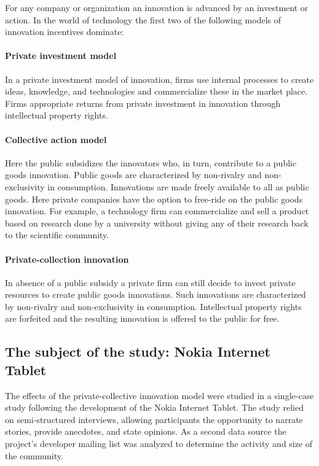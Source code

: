 \documentclass[a4paper]{scrartcl}
\begin{document}
For any company or organization an innovation is advanced by an investment or action.
In the world of technology the first two of the following models of innovation incentives dominate:

\paragraph{Private investment model}
In a private investment model of innovation, firms use internal processes to create ideas,
knowledge, and technologies and commercialize these in the market place. Firms appropriate
returns from private investment in innovation through intellectual property rights. 

\paragraph{Collective action model}
Here the public subsidizes the innovators who, in turn, contribute to a public goods innovation.
Public goods are characterized by non-rivalry and non-exclusivity in consumption.
Innovations are made freely available to all as public goods.
Here private companies have the option to free-ride on the public goods innovation.
For example, a technology firm can commercialize and sell a product based on research done by a university without giving any of their research back to the scientific community. 

\paragraph{Private-collection innovation}
In absence of a public subsidy a private firm can still decide to invest private resources to create public goods innovations. 
Such innovations are characterized by non-rivalry and non-exclusivity in consumption.
Intellectual property rights are forfeited and the resulting innovation is offered to the public for free.


\subsection{The subject of the study: Nokia Internet Tablet}

The effects of the private-collective innovation model were studied in a single-case study following the development of the Nokia Internet Tablet.
The study relied on semi-structured interviews, allowing participants the opportunity
to narrate stories, provide anecdotes, and state opinions.
As a second data source the project's developer mailing list was analyzed to determine the activity and size of the community.
\end{document}
